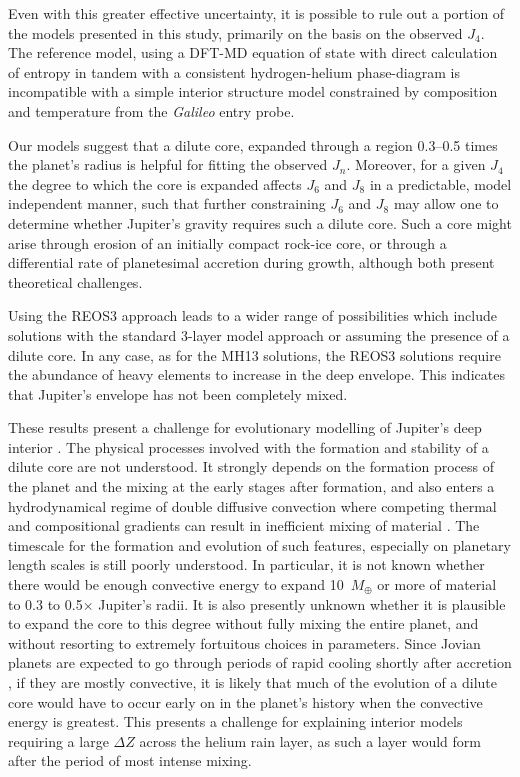 Even with this greater effective uncertainty, it is possible to rule out
a portion of the models presented in this study, primarily on the basis on the
observed $J_4$. The reference model, using a DFT-MD equation of state with
direct calculation of entropy in tandem with a consistent hydrogen-helium
phase-diagram is incompatible with a simple interior structure  model
constrained by composition and temperature from the \textit{Galileo} entry
probe. 

Our models suggest that a dilute core, expanded through a region 0.3--0.5
times the planet's radius is helpful for fitting the observed $J_n$.  Moreover,
for a given $J_4$ the degree to which the core is expanded affects $J_6$ and
$J_8$ in a predictable, model independent manner, such that further
constraining $J_6$ and $J_8$ may allow one to determine whether Jupiter's
gravity requires such a dilute core. Such a core might arise through erosion
of an initially compact rock-ice core, or through a differential rate of
planetesimal accretion during growth, although both present theoretical
challenges.

Using the REOS3 approach leads to a wider range of possibilities which include
solutions with the standard 3-layer model approach or assuming the presence of
a dilute core.  In any case, as for the MH13 solutions, the REOS3 solutions
require the abundance of heavy elements to increase in the deep envelope. This
indicates that Jupiter's envelope has not been completely mixed. 

These results present a challenge for evolutionary modelling of Jupiter's deep
interior  \citep[e.g.][]{vazan2016,mankovich2016}.  The physical processes
involved with the formation and stability of a dilute core are not understood.
It strongly depends on the formation process of the planet and the mixing at
the early stages after formation, and also enters a hydrodynamical regime of
double diffusive convection where competing thermal and compositional gradients
can result in inefficient mixing of material \citep{Leconte2012,Mirouh2012}.
The timescale for the formation and evolution of such features, especially on
planetary length scales is still poorly understood.  In particular, it is not
known whether there would be enough convective energy to expand 10~$M_\oplus$
or more of material to 0.3 to 0.5$\times$ Jupiter's radii. It is also presently
unknown whether it is plausible to expand the core to this degree without fully
mixing the entire planet, and without resorting to extremely fortuitous choices
in parameters.  Since Jovian planets are expected to go through periods of
rapid cooling shortly after accretion \citep{Fortney2010}, if they are mostly
convective, it is likely that much of the evolution of a dilute core would
have to occur early on in the planet's history when the convective energy is
greatest. This presents a challenge for explaining interior models requiring a
large $\Delta Z$ across the helium rain layer, as such a layer would form after the
period of most intense mixing.

